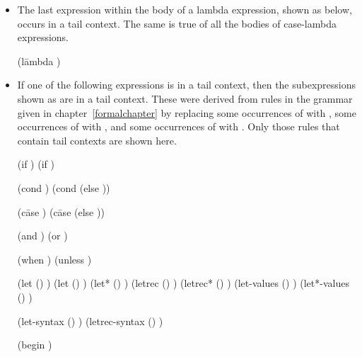\begin{itemize}
\item The last expression within the body of a lambda expression,
  shown as  below, occurs in a tail context.
  The same is true of all the bodies of {\cf case-lambda} expressions.
\begin{grammar}%
(l\=ambda 
  \>  )
\end{grammar}%

\item If one of the following expressions is in a tail context,
then the subexpressions shown as  are in a tail context.
These were derived from rules in the grammar given in
chapter~\ref{formalchapter} by replacing some occurrences of 
with ,  some occurrences of 
with ,  and some occurrences of 
with .  Only those rules that contain tail contexts
are shown here.

\begin{grammar}%
(if   )
(if  )

(cond )
(cond  (else ))

(c\=ase 
  \>)
(c\=ase 
  \>
  \>(else ))

(and  )
(or  )

(when  )
(unless  )

(let () )
(let  () )
(let* () )
(letrec () )
(letrec* () )
(let-values () )
(let*-values () )

(let-syntax () )
(letrec-syntax () )

(begin )


\end{grammar}
\end{itemize}
